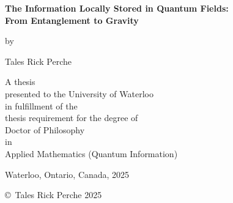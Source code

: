 \pagestyle{empty}

\begin{titlepage}
        \begin{center}
        \vspace*{1.0cm}

        \Huge
        {\bf The Information Locally Stored in Quantum Fields:\\ From Entanglement to Gravity}

        \vspace*{1.0cm}

        \normalsize
        by \\

        \vspace*{1.0cm}

        \Large
        Tales Rick Perche \\

        \vspace*{3.0cm}

        \normalsize
        A thesis\\ presented to the
        University of Waterloo \\ 
        in fulfillment of the \\
        thesis requirement for the degree of \\
        Doctor of Philosophy \\
        in \\
       Applied Mathematics (Quantum Information) \\

        \vspace*{2.0cm}

        Waterloo, Ontario, Canada, 2025 \\

        \vspace*{1.0cm}

        \copyright\ Tales Rick Perche 2025 \\
        \end{center}
\end{titlepage}

\pagestyle{plain}
\setcounter{page}{2}

